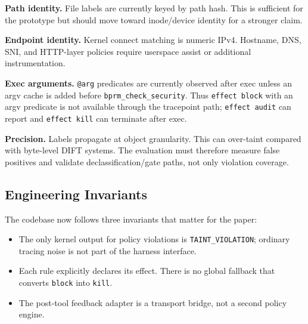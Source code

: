 \textbf{Path identity.} File labels are currently keyed by path hash. This is
sufficient for the prototype but should move toward inode/device identity for a
stronger claim.

\textbf{Endpoint identity.} Kernel connect matching is numeric IPv4. Hostname,
DNS, SNI, and HTTP-layer policies require userspace assist or additional
instrumentation.

\textbf{Exec arguments.} \texttt{@arg} predicates are currently observed after
exec unless an argv cache is added before \texttt{bprm\_check\_security}. Thus
\texttt{effect block} with an argv predicate is not available through the
tracepoint path; \texttt{effect audit} can report and \texttt{effect kill} can
terminate after exec.

\textbf{Precision.} Labels propagate at object granularity. This can over-taint
compared with byte-level DIFT systems. The evaluation must therefore measure
false positives and validate declassification/gate paths, not only violation
coverage.

\subsection{Engineering Invariants}

The codebase now follows three invariants that matter for the paper:

\begin{itemize}
\item The only kernel output for policy violations is
\texttt{TAINT\_VIOLATION}; ordinary tracing noise is not part of the harness
interface.
\item Each rule explicitly declares its effect. There is no global fallback that
converts \texttt{block} into \texttt{kill}.
\item The post-tool feedback adapter is a transport bridge, not a second policy
engine.
\end{itemize}
